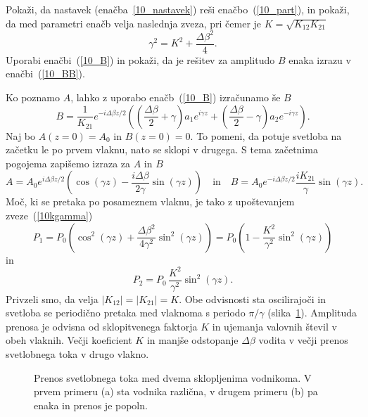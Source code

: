 \begin{definition}
 Pokaži, da  nastavek (enačba~\ref{10_nastavek}) reši enačbo~(\ref{10_part}), in pokaži,
 da med parametri enačb velja naslednja zveza, pri čemer je $K = \sqrt{K_{12}K_{21}}$
 \begin{equation}
 \gamma^2 = K^2 + \frac{\Delta \beta ^2}{4}.
 \label{10kgamma}
 \end{equation}
 Uporabi enačbi~(\ref{10_B}) in pokaži, da je rešitev za amplitudo $B$
 enaka izrazu v enačbi~(\ref{10_BB}).
\end{definition}
Ko poznamo $A$, lahko z uporabo enačb~(\ref{10_B}) izračunamo še $B$
\begin{equation}
B = \frac{1}{K_{21}}
e^{-i \Delta \beta z/2}\left(\left(\frac{\Delta \beta}{2} +\gamma \right) a_1 e^{i \gamma z} + 
\left(\frac{\Delta \beta}{2} -\gamma \right)a_2 e^{-i \gamma z}\right)\!.
\label{10_BB}
\end{equation}
Naj bo $A(z=0) = A_0$ in $B(z=0)=0$. To pomeni, da potuje svetloba na začetku
le po prvem vlaknu, nato se sklopi v drugega. S tema začetnima pogojema zapišemo izraza 
za $A$ in $B$
\begin{equation}
 A = A_0 e^{i \Delta \beta z/2} \left( \cos(\gamma z) - 
\frac{i \Delta \beta}{2 \gamma}\sin(\gamma z) \right)
\quad \mathrm{in} \quad 
B =  A_0 e^{-i \Delta \beta z/2} \frac{i K_{21}}{\gamma}\sin(\gamma z).
\end{equation}
Moč, ki se pretaka po posameznem vlaknu, je tako z upoštevanjem zveze~(\ref{10kgamma})
\begin{equation}
P_1 = P_0 \left( \cos^2(\gamma z) + \frac{\Delta \beta^2}{4 \gamma^2}\sin^2(\gamma z) \right)
= P_0 \left( 1 - \frac{K^2}{\gamma^2}\sin^2(\gamma z) \right)
\end{equation}
in
\begin{equation}
P_2 =  P_0\, \frac{K^2}{\gamma^2}\sin^2(\gamma z).
\end{equation}
Privzeli smo, da velja $|K_{12}|=|K_{21}|= K$. 
Obe odvisnosti sta oscilirajoči in svetloba se periodično pretaka med vlaknoma
s periodo $\pi/\gamma$ (slika~\ref{fig:foscil}). Amplituda prenosa je 
odvisna od sklopitvenega faktorja $K$ in ujemanja valovnih 
števil v obeh vlaknih. Večji koeficient $K$
in manjše odstopanje $\Delta \beta$ vodita v večji prenos svetlobnega toka v drugo vlakno. 
\begin{figure}[ht]
\centering
\def\svgwidth{140truemm} 
 
\caption{Prenos svetlobnega toka med dvema sklopljenima vodnikoma. V prvem primeru (a) sta
vodnika različna, v drugem primeru (b) pa enaka in prenos je popoln.}
\label{fig:foscil}
\end{figure}

